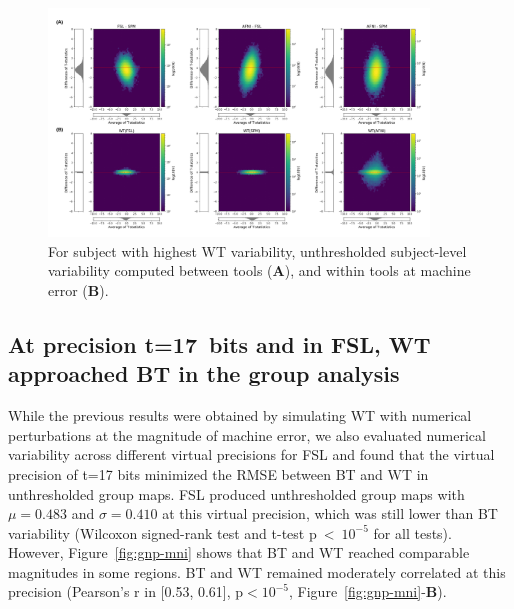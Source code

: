 \documentclass[11pt,onecolumn]{article}
\begin{document}
\begin{figure}[ht]
  \centering
  \includegraphics[width=0.9\textwidth]{figures/plots/Bland-Altman/unthresh-sbj05.png}
  \caption{For subject with highest WT variability,
    unthresholded subject-level variability computed between tools (\textbf{A}), and within tools at machine error (\textbf{B}).}
  \label{fig:unthresh-maps-sbj}
\end{figure}

\subsection{At precision t=17~bits and in FSL, WT approached BT in the group analysis}
While the previous results were obtained by simulating WT with numerical perturbations 
at the magnitude of machine error, we also
evaluated numerical variability across different virtual precisions for FSL
and found that the virtual precision of t=17 bits minimized the RMSE
between BT and WT in unthresholded group maps.
FSL produced unthresholded group maps with $\mu=0.483$ and $\sigma=0.410$ at this virtual precision,
which was still lower than BT variability
(Wilcoxon signed-rank test and t-test p~\textless~$10^{-5}$ for all tests).
However, Figure~\ref{fig:gnp-mni} shows that
BT and WT reached comparable magnitudes in some regions. BT and WT remained
moderately correlated at this precision (Pearson's r
in [0.53, 0.61], p$< 10^{-5}$, Figure~\ref{fig:gnp-mni}-\textbf{B}).
\end{document}
